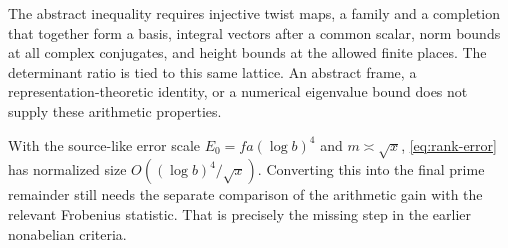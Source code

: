 The abstract inequality requires injective twist maps, a family and a completion that together form a basis, integral vectors after a common scalar, norm bounds at all complex conjugates, and height bounds at the allowed finite places. The determinant ratio is tied to this same lattice. An abstract frame, a representation-theoretic identity, or a numerical eigenvalue bound does not supply these arithmetic properties.

With the source-like error scale $E_0=fa(\log b)^4$ and $m\asymp\sqrt x$, \eqref{eq:rank-error} has normalized size $O((\log b)^4/\sqrt x)$. Converting this into the final prime remainder still needs the separate comparison of the arithmetic gain with the relevant Frobenius statistic. That is precisely the missing step in the earlier nonabelian criteria.
